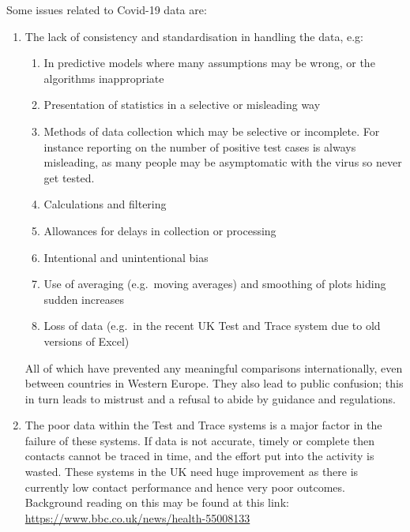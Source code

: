 Some issues related to Covid-19 data are:
\begin{enumerate}
\item The lack of consistency and standardisation in handling the data, e.g:
  \begin{enumerate}[label=\color{dsiwgAccentColour}{\alph*.}]
  \item In predictive models where many assumptions may be wrong, or the algorithms inappropriate
  \item Presentation of statistics in a selective or misleading way
  \item Methods of data collection which may be selective or incomplete. For instance reporting on the number of positive test cases is always misleading, as many people may be asymptomatic with the virus so never get tested.
  \item Calculations and filtering
  \item Allowances for delays in collection or processing
  \item Intentional and unintentional bias
  \item Use of averaging (e.g.\ moving averages) and smoothing of plots hiding sudden increases
  \item Loss of data (e.g.\ in the recent UK Test and Trace system due to old versions of Excel)
  \end{enumerate}
All of which have prevented any meaningful comparisons internationally, even between countries in Western Europe. They also lead to public confusion; this in turn leads to mistrust and a refusal to abide by guidance and regulations. 

\item The poor data within the Test and Trace systems is a major factor in the failure of these systems. If data is not accurate, timely or complete then contacts cannot be traced in time, and the effort put into the activity is wasted. These systems in the UK need huge improvement as there is currently low contact performance and hence very poor outcomes. Background reading on this may be found at this link: \href{https://www.bbc.co.uk/news/health-55008133}{https://www.bbc.co.uk/news/health-55008133}
\end{enumerate}


